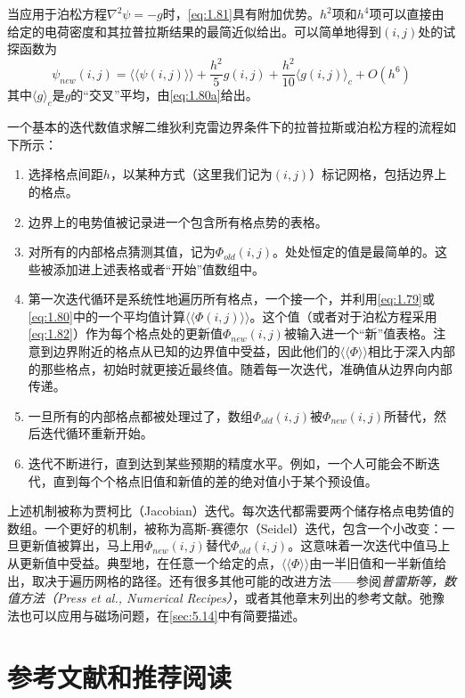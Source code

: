 \documentclass[12pt]{book}
\numberwithin{equation}{chapter}
\numberwithin{figure}{chapter}
\numberwithin{footnote}{page}
\begin{document}
当应用于泊松方程$\nabla^2\psi=-g$时，\autoref{eq:1.81}具有附加优势。$h^2$项和$h^4$项可以直接由给定的电荷密度和其拉普拉斯结果的最简近似给出。可以简单地得到$(i,j)$处的试探函数为
\begin{equation}\label{eq:1.82}
    \psi_{new}(i,j)=\langle\langle\psi(i,j)\rangle\rangle+\frac{h^2}{5}g(i,j)+\frac{h^2}{10}\langle g(i,j)\rangle_c+O(h^6)
\end{equation}
其中$\langle g\rangle_c$是$g$的“交叉”平均，由\autoref{eq:1.80a}给出。

一个基本的迭代数值求解二维狄利克雷边界条件下的拉普拉斯或泊松方程的流程如下所示：
\begin{enumerate}
    \item 选择格点间距$h$，以某种方式（这里我们记为$(i,j)$）标记网格，包括边界上的格点。
    \item 边界上的电势值被记录进一个包含所有格点势的表格。
    \item 对所有的内部格点猜测其值，记为$\Phi_{old}(i,j)$。处处恒定的值是最简单的。这些被添加进上述表格或者“开始”值数组中。
    \item 第一次迭代循环是系统性地遍历所有格点，一个接一个，并利用\autoref{eq:1.79}或\autoref{eq:1.80}中的一个平均值计算$\langle\langle\Phi(i,j)\rangle\rangle$。这个值（或者对于泊松方程采用\autoref{eq:1.82}）作为每个格点处的更新值$\Phi_{new}(i,j)$被输入进一个“新”值表格。注意到边界附近的格点从已知的边界值中受益，因此他们的$\langle\langle\Phi\rangle\rangle$相比于深入内部的那些格点，初始时就更接近最终值。随着每一次迭代，准确值从边界向内部传递。
    \item 一旦所有的内部格点都被处理过了，数组$\Phi_{old}(i,j)$被$\Phi_{new}(i,j)$所替代，然后迭代循环重新开始。
    \item 迭代不断进行，直到达到某些预期的精度水平。例如，一个人可能会不断迭代，直到每个个格点旧值和新值的差的绝对值小于某个预设值。
\end{enumerate}

上述机制被称为贾柯比（Jacobian）迭代。每次迭代都需要两个储存格点电势值的数组。一个更好的机制，被称为高斯-赛德尔（Seidel）迭代，包含一个小改变：一旦更新值被算出，马上用$\Phi_{new}(i,j)$替代$\Phi_{old}(i,j)$。这意味着一次迭代中值马上从更新值中受益。典型地，在任意一个给定的点，$\langle\langle\Phi\rangle\rangle$由一半旧值和一半新值给出，取决于遍历网格的路径。还有很多其他可能的改进方法——参阅\textit{普雷斯等，数值方法（Press et al., Numerical Recipes）}，或者其他章末列出的参考文献。弛豫法也可以应用与磁场问题，在\autoref{sec:5.14}中有简要描述。

\section*{参考文献和推荐阅读}
\end{document}
